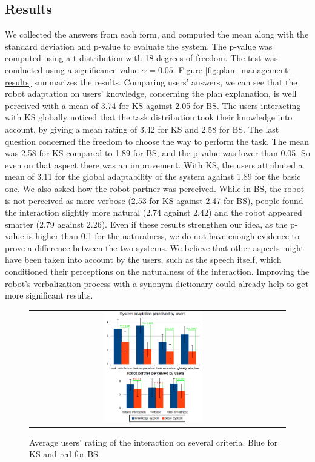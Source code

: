\subsection{Results}

We collected the answers from each form, and computed the mean along with the standard deviation and p-value to evaluate the system. The p-value was computed using a t-distribution with 18 degrees of freedom. The test was conducted using a significance value $\alpha=0.05$.
Figure \ref{fig:plan_management-results} summarizes the results. Comparing users' answers, we can see that the robot adaptation on users' knowledge, concerning the plan explanation, is well perceived with a mean of 3.74 for KS against 2.05 for BS. The users interacting with KS globally noticed that the task distribution took their knowledge into account, by giving a mean rating of 3.42 for KS and 2.58 for BS. The last question concerned the freedom to choose the way to perform the task. The mean was 2.58 for KS compared to 1.89 for BS, and the p-value was lower than 0.05. So even on that aspect there was an improvement. 
With KS, the users attributed a mean of 3.11 for the global adaptability of the system against 1.89 for the basic one.
We also asked how the robot partner was perceived. While in BS, the robot is not perceived as more verbose (2.53 for KS against 2.47 for BS), people found the interaction slightly more natural (2.74 against 2.42) and the robot appeared smarter (2.79 against 2.26). Even if these results strengthen our idea, as the p-value is higher than 0.1 for the naturalness, we do not have enough evidence to prove a difference between the two systems. We believe that other aspects might have been taken into account by the users, such as the speech itself, which conditioned their perceptions on the naturalness of the interaction. Improving the robot's verbalization process with a synonym dictionary could already help to get more significant results.



 \begin{figure}[ht!]
 \centering
 \begin{tabular}{cc}
  \includegraphics[width=0.41\textwidth]{img/plan_management/respvalue3.png}
 \end{tabular}
 \caption{Average users' rating of the interaction on several criteria. Blue for KS and red for BS.}
 \label{fig:results}
 \end{figure}

